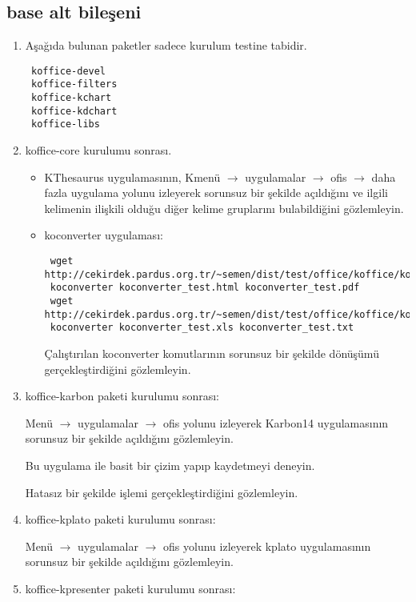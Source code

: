\documentclass[a4paper,10pt]{article}
\begin{document}
\subsection*{base alt bileşeni}
\begin{enumerate}
\item Aşağıda bulunan paketler sadece kurulum testine tabidir.

\begin{verbatim}
 koffice-devel 
 koffice-filters
 koffice-kchart
 koffice-kdchart
 koffice-libs
\end{verbatim}
\item koffice-core kurulumu sonrası.

\begin{itemize}
\item KThesaurus uygulamasının, Kmenü $\rightarrow$ uygulamalar $\rightarrow$ ofis $\rightarrow$ daha fazla uygulama yolunu izleyerek sorunsuz bir şekilde açıldığını ve ilgili kelimenin ilişkili olduğu diğer kelime gruplarını bulabildiğini gözlemleyin.

\item koconverter uygulaması:
\begin{verbatim}
 wget http://cekirdek.pardus.org.tr/~semen/dist/test/office/koffice/koconverter_test.html
 koconverter koconverter_test.html koconverter_test.pdf
 wget http://cekirdek.pardus.org.tr/~semen/dist/test/office/koffice/koconverter_test.xls
 koconverter koconverter_test.xls koconverter_test.txt
\end{verbatim}

Çalıştırılan koconverter komutlarının sorunsuz bir şekilde dönüşümü gerçekleştirdiğini gözlemleyin.
\end{itemize}
\item koffice-karbon paketi kurulumu sonrası:

Menü $\rightarrow$ uygulamalar $\rightarrow$ ofis yolunu izleyerek Karbon14 uygulamasının sorunsuz bir şekilde açıldığını gözlemleyin.

Bu uygulama ile basit bir çizim yapıp kaydetmeyi deneyin.

Hatasız bir şekilde işlemi gerçekleştirdiğini gözlemleyin.

\item koffice-kplato paketi kurulumu sonrası:

Menü $\rightarrow$ uygulamalar $\rightarrow$ ofis yolunu izleyerek kplato uygulamasının sorunsuz bir şekilde açıldığını gözlemleyin.

\item koffice-kpresenter paketi kurulumu sonrası:


\end{enumerate}
\end{document}
